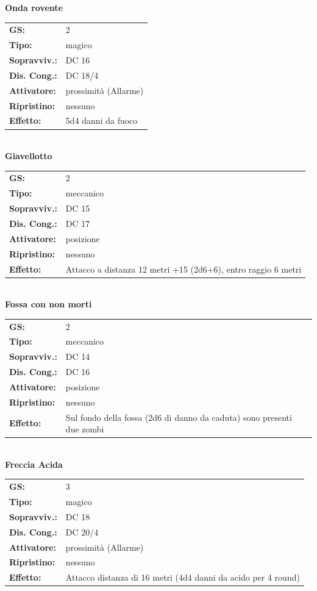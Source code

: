 \begin{multicols}{2}
\textbf{Onda rovente}

\begin{tabularx}{0.48\textwidth}{lX}
	\textbf{GS:} & 2 \\
	\textbf{Tipo:} & magico \\
	\textbf{Sopravviv.:} & DC 16 \\
	\textbf{Dis. Cong.:} & DC 18/4 \\
	\textbf{Attivatore:} & prossimità (Allarme) \\
	\textbf{Ripristino:} & nessuno \\
	\textbf{Effetto:} & 5d4 danni da fuoco 
\end{tabularx}\\

\textbf{Giavellotto}

\begin{tabularx}{0.48\textwidth}{lX}
	\textbf{GS:} & 2 \\
	\textbf{Tipo:} & meccanico \\
	\textbf{Sopravviv.:} & DC 15 \\
	\textbf{Dis. Cong.:} & DC 17 \\
	\textbf{Attivatore:} & posizione \\
	\textbf{Ripristino:} & nessuno \\
	\textbf{Effetto:} & Attacco a distanza 12 metri +15 (2d6+6), entro raggio 6 metri 
\end{tabularx}\\

\textbf{Fossa con non morti}

\begin{tabularx}{0.48\textwidth}{lX}
	\textbf{GS:} & 2 \\
	\textbf{Tipo:} & meccanico \\
	\textbf{Sopravviv.:} & DC 14 \\
	\textbf{Dis. Cong.:} & DC 16 \\
	\textbf{Attivatore:} & posizione \\
	\textbf{Ripristino:} & nessuno \\
	\textbf{Effetto:} & Sul fondo della fossa (2d6 di danno da caduta) sono presenti due zombi 
\end{tabularx}\\

\textbf{Freccia Acida}

\begin{tabularx}{0.48\textwidth}{lX}
	\textbf{GS:} & 3 \\
	\textbf{Tipo:} & magico \\
	\textbf{Sopravviv.:} & DC 18 \\
	\textbf{Dis. Cong.:} & DC 20/4 \\
	\textbf{Attivatore:} & prossimità (Allarme) \\
	\textbf{Ripristino:} & nessuno \\
	\textbf{Effetto:} & Attacco distanza di 16 metri (4d4 danni da acido per 4 round) 
\end{tabularx}\\


\end{multicols}
